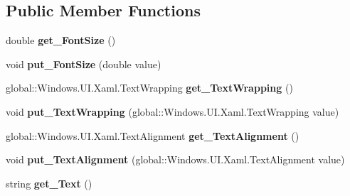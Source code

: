 \subsection*{Public Member Functions}
\begin{DoxyCompactItemize}
\item 
\mbox{\label{class_windows_1_1_u_i_1_1_xaml_1_1_controls_1_1_text_block_ae396cab368662cf3d314b4c8cf21d51b}} 
double {\bfseries get\+\_\+\+Font\+Size} ()
\item 
\mbox{\label{class_windows_1_1_u_i_1_1_xaml_1_1_controls_1_1_text_block_a610333d337bf2e0cf5c901ca88ce3a21}} 
void {\bfseries put\+\_\+\+Font\+Size} (double value)
\item 
\mbox{\label{class_windows_1_1_u_i_1_1_xaml_1_1_controls_1_1_text_block_a7e6fe2e6c2baed541c6ec98293bfde3e}} 
global\+::\+Windows.\+U\+I.\+Xaml.\+Text\+Wrapping {\bfseries get\+\_\+\+Text\+Wrapping} ()
\item 
\mbox{\label{class_windows_1_1_u_i_1_1_xaml_1_1_controls_1_1_text_block_ac924a5e979a26efc36bd609cb83b92d7}} 
void {\bfseries put\+\_\+\+Text\+Wrapping} (global\+::\+Windows.\+U\+I.\+Xaml.\+Text\+Wrapping value)
\item 
\mbox{\label{class_windows_1_1_u_i_1_1_xaml_1_1_controls_1_1_text_block_ac6b29ca491dedd9ebb342072b1916a79}} 
global\+::\+Windows.\+U\+I.\+Xaml.\+Text\+Alignment {\bfseries get\+\_\+\+Text\+Alignment} ()
\item 
\mbox{\label{class_windows_1_1_u_i_1_1_xaml_1_1_controls_1_1_text_block_a284f18b28cc583c43ba5d9187d561ef7}} 
void {\bfseries put\+\_\+\+Text\+Alignment} (global\+::\+Windows.\+U\+I.\+Xaml.\+Text\+Alignment value)
\item 
\mbox{\label{class_windows_1_1_u_i_1_1_xaml_1_1_controls_1_1_text_block_ae14b2c8d9da353fd995b80695d4caad0}} 
string {\bfseries get\+\_\+\+Text} ()

\end{DoxyCompactItemize}
